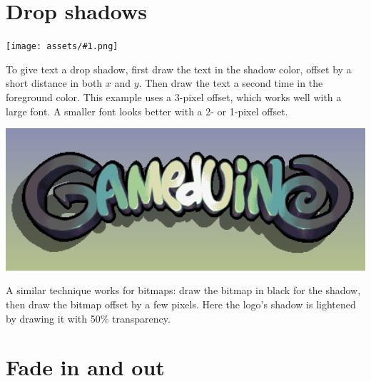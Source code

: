 \documentclass[10pt]{book}
\newcommand{\png}[1]{
\begin{center}
\texttt{[image: assets/\#1.png]}
\end{center}
}
\begin{document}
\newpage
\section{Drop shadows}
\png{0025}
To give text a drop shadow,
first draw the text in the shadow color, offset by a short distance in both $x$ and $y$.
Then draw the text a second time in the foreground color.
This example uses a 3-pixel offset, which works well with a large font.
A smaller font looks better with a 2- or 1-pixel offset.

\noindent
\begin{minipage}[][][t]{0.45\textwidth}
\includegraphics[width=1.0\textwidth]{assets/logodrop.png}
\end{minipage}
\begin{minipage}[][][t]{0.55\textwidth}
A similar technique works for bitmaps: draw the bitmap in black for the shadow, then draw the bitmap
offset by a few pixels.
Here the logo's shadow is lightened by drawing it with 50\% transparency.
\end{minipage}

\newpage
\section{Fade in and out}
\end{document}
